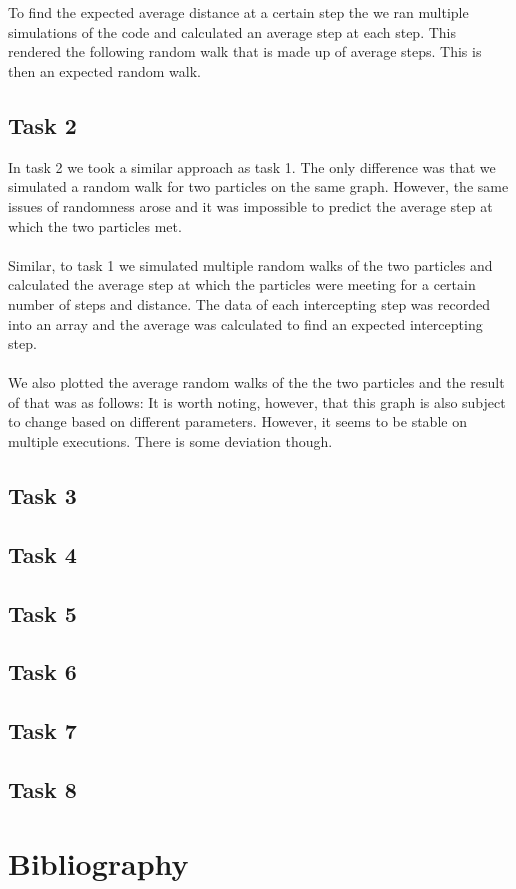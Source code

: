 \documentclass{article}
\begin{document}
\\\\
To find the expected average distance at a certain step the we ran multiple 
simulations of the code and calculated an average step at each step. This rendered
the following random walk that is made up of average steps. This is then an expected
random walk. 

\subsection{Task 2}
In task 2 we took a similar approach as task 1. The only difference was that we simulated a random walk 
for two particles on the same graph. However, the same issues of randomness arose and it was impossible to
predict the average step at which the two particles met. 
\\\\
Similar, to task 1 we simulated multiple random walks of the two particles and calculated the average step 
at which the particles were meeting for a certain number of steps and distance. The data of each intercepting 
step was recorded into an array and the average was calculated to find an expected intercepting step.
\\\\
We also plotted the average random walks of the the two particles and the result of that was as follows:
It is worth noting, however, that this graph is also subject to change based on different parameters. However, 
it seems to be stable on multiple executions. There is some deviation though. 
\subsection{Task 3}
\subsection{Task 4}
\subsection{Task 5}
\subsection{Task 6}
\subsection{Task 7}
\subsection{Task 8}
\section{Bibliography}
\end{document}
